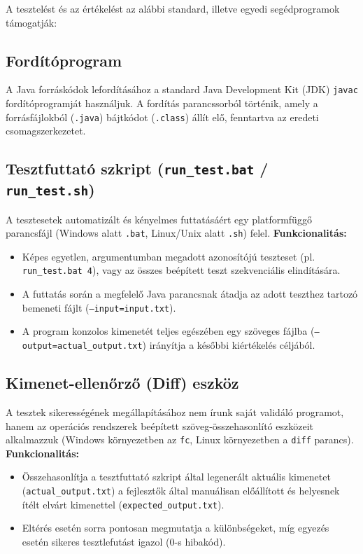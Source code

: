 A tesztelést és az értékelést az alábbi standard, illetve egyedi segédprogramok támogatják:

\subsection{Fordítóprogram}
A Java forráskódok lefordításához a standard Java Development Kit (JDK) \texttt{javac} fordítóprogramját használjuk. A fordítás parancssorból történik, amely a forrásfájlokból (\texttt{.java}) bájtkódot (\texttt{.class}) állít elő, fenntartva az eredeti csomagszerkezetet.

\subsection{Tesztfuttató szkript (\texttt{run\_test.bat} / \texttt{run\_test.sh})}
A tesztesetek automatizált és kényelmes futtatásáért egy platformfüggő parancsfájl (Windows alatt \texttt{.bat}, Linux/Unix alatt \texttt{.sh}) felel. 
\textbf{Funkcionalitás:}
\begin{itemize}
    \item Képes egyetlen, argumentumban megadott azonosítójú teszteset (pl. \texttt{run\_test.bat 4}), vagy az összes beépített teszt szekvenciális elindítására.
    \item A futtatás során a megfelelő Java parancsnak átadja az adott teszthez tartozó bemeneti fájlt (\texttt{--input=input.txt}).
    \item A program konzolos kimenetét teljes egészében egy szöveges fájlba (\texttt{--output=actual\_output.txt}) irányítja a későbbi kiértékelés céljából.
\end{itemize}

\subsection{Kimenet-ellenőrző (Diff) eszköz}
A tesztek sikerességének megállapításához nem írunk saját validáló programot, hanem az operációs rendszerek beépített szöveg-összehasonlító eszközeit alkalmazzuk (Windows környezetben az \texttt{fc}, Linux környezetben a \texttt{diff} parancs).
\textbf{Funkcionalitás:}
\begin{itemize}
    \item Összehasonlítja a tesztfuttató szkript által legenerált aktuális kimenetet (\texttt{actual\_output.txt}) a fejlesztők által manuálisan előállított és helyesnek ítélt elvárt kimenettel (\texttt{expected\_output.txt}).
    \item Eltérés esetén sorra pontosan megmutatja a különbségeket, míg egyezés esetén sikeres tesztlefutást igazol (0-s hibakód).
\end{itemize}
